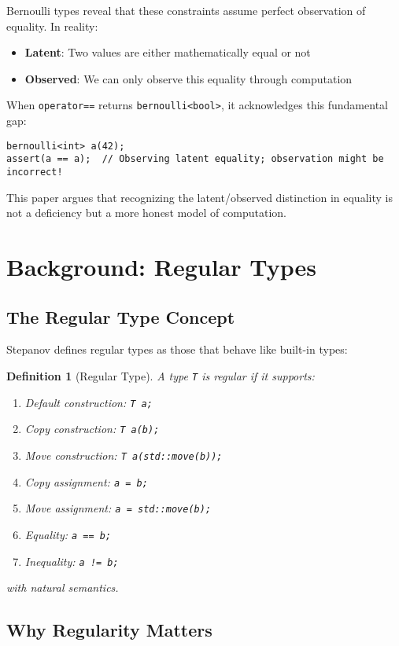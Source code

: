 \documentclass[11pt,final,hidelinks]{article}
\newtheorem{definition}[theorem]{Definition}
\newcommand{\code}[1]{\texttt{#1}}
\begin{document}
Bernoulli types reveal that these constraints assume perfect observation of equality. In reality:
\begin{itemize}
    \item \textbf{Latent}: Two values are either mathematically equal or not
    \item \textbf{Observed}: We can only observe this equality through computation
\end{itemize}

When \code{operator==} returns \code{bernoulli<bool>}, it acknowledges this fundamental gap:
\begin{verbatim}
bernoulli<int> a(42);
assert(a == a);  // Observing latent equality; observation might be incorrect!
\end{verbatim}

This paper argues that recognizing the latent/observed distinction in equality is not a deficiency but a more honest model of computation.

\section{Background: Regular Types}

\subsection{The Regular Type Concept}

Stepanov defines regular types as those that behave like built-in types:

\begin{definition}[Regular Type]
A type \code{T} is regular if it supports:
\begin{enumerate}
    \item Default construction: \code{T a;}
    \item Copy construction: \code{T a(b);}
    \item Move construction: \code{T a(std::move(b));}
    \item Copy assignment: \code{a = b;}
    \item Move assignment: \code{a = std::move(b);}
    \item Equality: \code{a == b;}
    \item Inequality: \code{a != b;}
\end{enumerate}
with natural semantics.
\end{definition}

\subsection{Why Regularity Matters}
\end{document}
